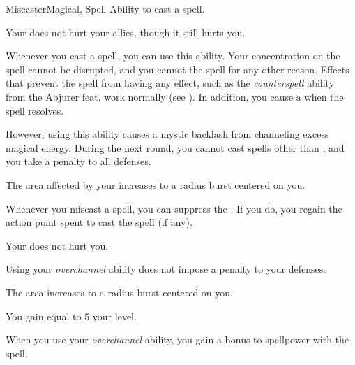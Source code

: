     \begin{feat}{Miscaster}{Magical, Spell}
        \featpre Ability to cast a spell.
        \featben

         Your  does not hurt your allies, though it still hurts you.

         Whenever you cast a spell, you can use this ability.
        Your concentration on the spell cannot be disrupted, and you cannot  the spell for any other reason.
        Effects that prevent the spell from having any effect, such as the \textit{counterspell} ability from the Abjurer feat, work normally (see ).
        In addition, you cause a  when the spell resolves.

        However, using this ability causes a mystic backlash from channeling excess magical energy.
        During the next round, you cannot cast spells other than , and you take a  penalty to all defenses.

         The area affected by your  increases to a \areasmall radius burst centered on you.

         Whenever you miscast a spell, you can suppress the .
        If you do, you regain the action point spent to cast the spell (if any).

         Your  does not hurt you.

         Using your \textit{overchannel} ability does not impose a penalty to your defenses.

         The area increases to a \areamed radius burst centered on you.

         You gain  equal to 5 \add your level.

         When you use your \textit{overchannel} ability, you gain a  bonus to spellpower with the spell.
    \end{feat}

